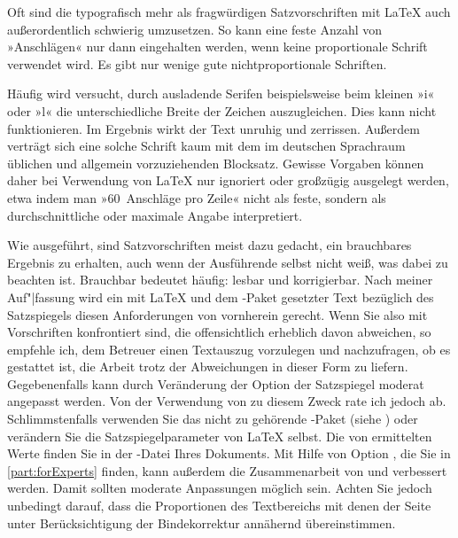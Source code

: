 Oft sind die typografisch mehr als fragwürdigen Satzvorschriften mit {\LaTeX}
auch außerordentlich schwierig umzusetzen. So kann eine feste Anzahl von
»Anschlägen« nur dann eingehalten werden, wenn keine proportionale Schrift
verwendet wird. Es gibt nur wenige gute nichtproportionale Schriften.
\iffalse %
Kaum ein Text, der mit einer derartigen Schrift gesetzt ist, wirkt wirklich
gut. So wird häufig %
\else
Häufig wird %
\fi %
versucht, durch ausladende Serifen beispielsweise beim kleinen
»i« oder »l« die unterschiedliche Breite der Zeichen auszugleichen. Dies kann
nicht funktionieren. Im Ergebnis wirkt der Text unruhig und
zerrissen. Außerdem verträgt sich eine solche Schrift kaum mit dem im
deutschen Sprachraum üblichen und allgemein vorzuziehenden Blocksatz. Gewisse
Vorgaben können daher bei Verwendung von {\LaTeX} nur ignoriert oder großzügig
ausgelegt werden, etwa indem man »60~Anschläge pro Zeile« nicht als feste,
sondern als durchschnittliche oder maximale Angabe interpretiert.

Wie ausgeführt, sind Satzvorschriften meist dazu gedacht, ein brauchbares
Ergebnis zu erhalten, auch wenn der Ausführende selbst nicht weiß, was dabei
zu beachten ist. Brauchbar bedeutet häufig: lesbar und korrigierbar. Nach
meiner Auf"|fassung wird ein mit {\LaTeX} und dem -Paket
gesetzter Text bezüglich des Satzspiegels diesen Anforderungen von vornherein
gerecht. Wenn Sie also mit Vorschriften konfrontiert sind, die offensichtlich
erheblich davon abweichen, so empfehle ich, dem Betreuer einen Textauszug
vorzulegen und nachzufragen, ob es gestattet ist, die Arbeit trotz der
Abweichungen in dieser Form zu liefern. Gegebenenfalls kann durch Veränderung
der Option
 der
Satzspiegel moderat angepasst werden. Von der Verwendung von
 zu diesem Zweck rate ich jedoch
ab. Schlimmstenfalls verwenden Sie das nicht zu {\KOMAScript} gehörende
-Paket
(siehe \cite{package:geometry}) oder verändern Sie die Satzspiegelparameter
von {\LaTeX} selbst. Die von  ermittelten Werte finden Sie
in der -Datei Ihres Dokuments. Mit Hilfe von Option
%
, die Sie in
\autoref{part:forExperts} finden, kann außerdem die Zusammenarbeit von
 und  verbessert werden. Damit sollten
moderate Anpassungen möglich sein. Achten Sie jedoch unbedingt darauf, dass
die Proportionen des Textbereichs mit denen der Seite unter Berücksichtigung
der Bindekorrektur annähernd übereinstimmen.

